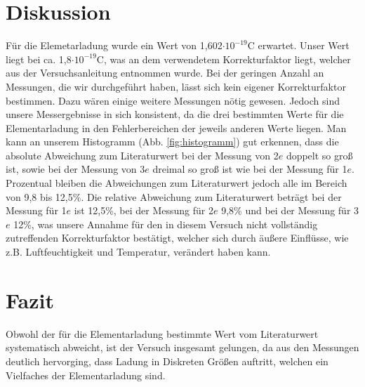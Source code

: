 \documentclass[12pt]{scrartcl}
\begin{document}
\section{Diskussion}
Für die Elemetarladung wurde ein Wert von 1,602$\cdot 10^{-19}$C erwartet. Unser Wert liegt bei ca. 1,8$\cdot 10^{-19}$C, was an dem verwendetem Korrekturfaktor liegt, welcher aus der Versuchsanleitung entnommen wurde. Bei der geringen Anzahl an Messungen, die wir durchgeführt haben, lässt sich kein eigener Korrekturfaktor bestimmen. Dazu wären einige weitere Messungen nötig gewesen. Jedoch sind unsere Messergebnisse in sich konsistent, da die drei bestimmten Werte für die Elementarladung in den Fehlerbereichen der jeweils anderen Werte liegen. Man kann an unserem Histogramm (Abb. \ref{fig:histogramm}) gut erkennen, dass die absolute Abweichung zum Literaturwert bei der Messung von 2$e$ doppelt so groß ist, sowie bei der Messung von 3$e$ dreimal so groß ist wie bei der Messung für 1$e$. Prozentual bleiben die Abweichungen zum Literaturwert jedoch alle im Bereich von 9,8 bis 12,5\%. Die relative Abweichung zum Literaturwert beträgt bei der Messung für 1$e$ ist 12,5\%, bei der Messung für 2$e$ 9,8\% und bei der Messung für 3$e$ 12\%, was unsere Annahme für den in diesem Versuch nicht vollständig zutreffenden Korrekturfaktor bestätigt, welcher sich durch äußere Einflüsse, wie z.B. Luftfeuchtigkeit und Temperatur, verändert haben kann.   

\section{Fazit}
Obwohl der für die Elementarladung bestimmte Wert vom Literaturwert systematisch abweicht, ist der Versuch insgesamt gelungen, da aus den Messungen deutlich hervorging, dass Ladung in Diskreten Größen auftritt, welchen ein Vielfaches der Elementarladung sind.
\end{document}

